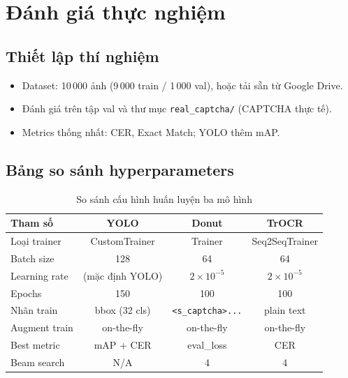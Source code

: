 \documentclass[a4paper,12pt]{report}
\begin{document}
\chapter{Đánh giá thực nghiệm}

\section{Thiết lập thí nghiệm}
\begin{itemize}[leftmargin=*]
  \item Dataset: 10\,000 ảnh (9\,000 train / 1\,000 val), hoặc tải sẵn từ Google Drive.
  \item Đánh giá trên tập val và thư mục \texttt{real\_captcha/} (CAPTCHA thực tế).
  \item Metrics thống nhất: CER, Exact Match; YOLO thêm mAP.
\end{itemize}

\section{Bảng so sánh hyperparameters}
\begin{table}[H]
  \centering
  \caption{So sánh cấu hình huấn luyện ba mô hình}
  \begin{tabular}{lccc}
    \toprule
    \textbf{Tham số} & \textbf{YOLO} & \textbf{Donut} & \textbf{TrOCR} \\
    \midrule
    Loại trainer & CustomTrainer & Trainer & Seq2SeqTrainer \\
    Batch size & 128 & 64 & 64 \\
    Learning rate & (mặc định YOLO) & $2 \times 10^{-5}$ & $2 \times 10^{-5}$ \\
    Epochs & 150 & 100 & 100 \\
    Nhãn train & bbox (32 cls) & \texttt{<s\_captcha>...} & plain text \\
    Augment train & on-the-fly & on-the-fly & on-the-fly \\
    Best metric & mAP + CER & eval\_loss & CER \\
    Beam search & N/A & 4 & 4 \\
    \bottomrule
  \end{tabular}
\end{table}
\end{document}
